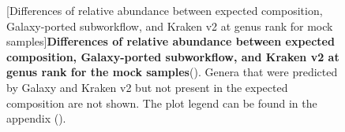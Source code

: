 \begin{figure}[H]
  \centering
  [Differences of relative abundance between expected composition, Galaxy-ported subworkflow, and Kraken v2 at genus rank for mock samples]{\textbf{Differences of relative abundance between expected composition, Galaxy-ported subworkflow, and Kraken v2 at genus rank for the mock samples}(). Genera that were predicted by Galaxy and Kraken v2 but not present in the expected composition are not shown. The plot legend can be found in the appendix ().} \label{fig:mock_rel_abundance}%
\end{figure}